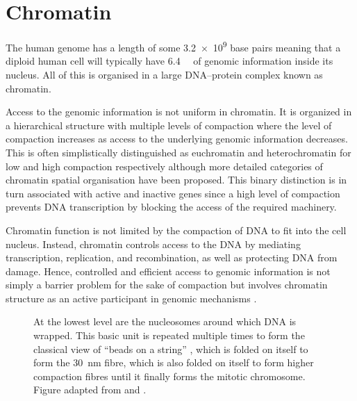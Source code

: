 \section{Chromatin}

  The human genome has a length of some \num{3.2e9}
  base pairs \citep{nature-first-human-genome-draft}
  meaning that a diploid human cell will
  typically have \SI{6.4}{\giga\bp} of genomic information inside
  its nucleus.
  All of this is organised in a large DNA--protein complex known as chromatin.

  Access to the genomic information is not uniform in chromatin.
  It is organized in a hierarchical structure with
  multiple levels of compaction  where
  the level of compaction increases as access to the underlying genomic
  information decreases.
  This is often simplistically distinguished as
  euchromatin and heterochromatin for low and
  high compaction respectively although more detailed categories of
  chromatin spatial organisation have been proposed.
  This binary distinction is in turn associated with active and inactive genes
  since a high level of compaction prevents DNA transcription by blocking
  the access of the required machinery\addref{}.

  Chromatin function is not limited by the compaction of DNA
  to fit into the cell nucleus.
  Instead, chromatin controls access
  to the DNA by mediating transcription, replication,
  and recombination, as
  well as protecting DNA from damage.  Hence, controlled and efficient
  access to genomic information is not simply a barrier problem for the sake
  of compaction but involves chromatin structure as an active
  participant in genomic mechanisms \citep{controlling-double-helix}.

  \begin{figure}
    \centering
    \def\svgwidth{\textwidth}
                 {At the lowest level are the nucleosomes around which
                  DNA is wrapped.
                  This basic unit is repeated multiple times to form
                  the classical view of ``beads on a string''
                  ,
                  which is folded on itself to form the
                  \SI{30}{\nano\meter} fibre,
                  which is also folded on itself to form higher
                  compaction fibres until it finally forms the
                  mitotic chromosome.
                  Figure adapted from \cite{alberts} and \cite{lodish}.}
    \label{fig:intro:chromatin-structure}
  \end{figure}

